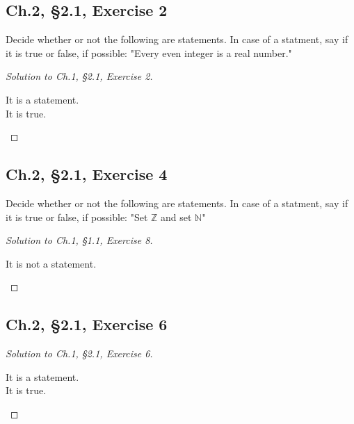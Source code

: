 \documentclass[12pt]{amsart}
\numberwithin{equation}{section}
\theoremstyle{definition}
\theoremstyle{remark}
\begin{document}
\subsection*{Ch.2, \S 2.1,  Exercise 2}  Decide whether or not the following are statements. In case of a statment, say if it is true or false, if possible: "Every even integer is a real number."


\begin{proof}[Solution to Ch.1, \S 2.1,  Exercise 2] 
\ \\

\begin{center}
It is a statement. \\
It is true.
\end{center}

\end{proof}




\subsection*{Ch.2, \S 2.1,  Exercise 4}  Decide whether or not the following are statements. In case of a statment, say if it is true or false, if possible: "Set $ \mathbb{Z} $ and set $ \mathbb{N} $"


\begin{proof}[Solution to Ch.1, \S 1.1,  Exercise 8]
\ \\

\begin{center}
It is not a statement.
\end{center}

\end{proof}




\subsection*{Ch.2, \S 2.1,  Exercise 6}  



\begin{proof}[Solution to Ch.1, \S 2.1,  Exercise 6]
\ \\

\begin{center}
It is a statement. \\
It is true.
\end{center}

\end{proof}
\end{document}
